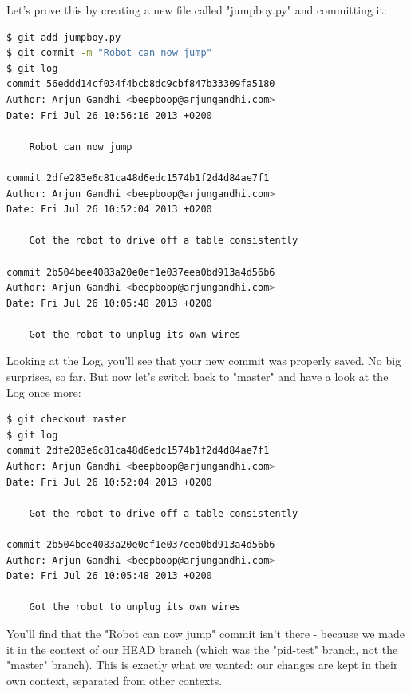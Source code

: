 \documentclass{article}
\begin{document}
Let's prove this by creating a new file called "jumpboy.py" and committing it:
\begin{lstlisting}[language=bash]
$ git add jumpboy.py
$ git commit -m "Robot can now jump"
$ git log
commit 56eddd14cf034f4bcb8dc9cbf847b33309fa5180
Author: Arjun Gandhi <beepboop@arjungandhi.com>
Date: Fri Jul 26 10:56:16 2013 +0200

    Robot can now jump

commit 2dfe283e6c81ca48d6edc1574b1f2d4d84ae7f1
Author: Arjun Gandhi <beepboop@arjungandhi.com>
Date: Fri Jul 26 10:52:04 2013 +0200

    Got the robot to drive off a table consistently

commit 2b504bee4083a20e0ef1e037eea0bd913a4d56b6
Author: Arjun Gandhi <beepboop@arjungandhi.com>
Date: Fri Jul 26 10:05:48 2013 +0200

    Got the robot to unplug its own wires
\end{lstlisting}
Looking at the Log, you'll see that your new commit was properly saved. No big surprises, so far. But now let's switch back to "master" and have a look at the Log once more:
\begin{lstlisting}[language=bash]
$ git checkout master
$ git log
commit 2dfe283e6c81ca48d6edc1574b1f2d4d84ae7f1
Author: Arjun Gandhi <beepboop@arjungandhi.com>
Date: Fri Jul 26 10:52:04 2013 +0200

    Got the robot to drive off a table consistently

commit 2b504bee4083a20e0ef1e037eea0bd913a4d56b6
Author: Arjun Gandhi <beepboop@arjungandhi.com>
Date: Fri Jul 26 10:05:48 2013 +0200

    Got the robot to unplug its own wires
\end{lstlisting}

You'll find that the "Robot can now jump" commit isn't there - because we made it in the context of our HEAD branch (which was the "pid-test" branch, not the "master" branch). This is exactly what we wanted: our changes are kept in their own context, separated from other contexts.
\end{document}
